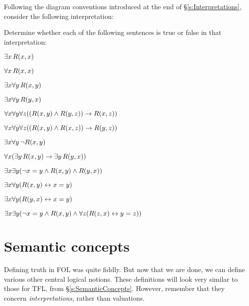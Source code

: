 \problempart
\label{pr.TorF3}
Following the diagram conventions introduced at the end of \S\ref{s:Interpretations}, consider the following interpretation:	
\begin{center}
\end{center}
Determine whether each of the following sentences is true or false in that interpretation:
\begin{earg}
\item $\exists x\, \mathord{R}(x,x)$
\item $\forall x\, \mathord{R}(x,x)$
\item $\exists x \forall y\, \mathord{R}(x,y)$
\item $\exists x \forall y\, \mathord{R}(y,x)$
\item $\forall x \forall y \forall z ((\mathord{R}(x,y) \wedge \mathord{R}(y,z)) \rightarrow \mathord{R}(x,z))$
\item $\forall x \forall y \forall z ((\mathord{R}(x,y) \wedge \mathord{R}(x,z)) \rightarrow \mathord{R}(y,z))$
\item $\exists x \forall y\, \neg \mathord{R}(x,y)$
\item $\forall x(\exists y\, \mathord{R}(x,y) \rightarrow \exists y\, \mathord{R}(y,x))$
\item $\exists x \exists y (\neg x = y \wedge \mathord{R}(x,y) \wedge \mathord{R}(y,x))$
\item $\exists x \forall y(\mathord{R}(x,y) \leftrightarrow x = y)$
\item $\exists x \forall y(\mathord{R}(y,x) \leftrightarrow x = y)$
\item $\exists x \exists y(\neg x = y \wedge \mathord{R}(x,y) \wedge \forall z(\mathord{R}(z,x) \leftrightarrow y = z))$
\end{earg}


\chapter{Semantic concepts}

Defining truth in FOL was quite fiddly. But now that we are done, we can define various other central logical notions. These definitions will look very similar to those for TFL, from \S\ref{s:SemanticConcepts}. However, remember that they concern \emph{interpretations}, rather than valuations. 

